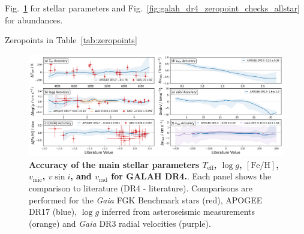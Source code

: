 \documentclass[
  journal=pasa,
  manuscript=research-paper, %
  year=2024,
  volume=37
]{cup-journal}
\newcommand{\SB}[1]{{\textcolor{purple}{#1}}}
\newcommand{\Teff}{$T_\mathrm{eff}$\xspace}
\newcommand{\logg}{$\log g$\xspace}
\newcommand{\feh}{$\mathrm{[Fe/H]}$\xspace}
\newcommand{\vmic}{$v_\mathrm{mic}$\xspace}
\newcommand{\vsini}{$v \sin i$\xspace}
\newcommand{\vrad}{$v_\mathrm{rad}$\xspace}
\newcommand{\Gaia}{\textit{Gaia}\xspace}
\begin{document}

Fig.~\ref{fig:galah_dr4_validation_parameter_accuracy_allstar} for stellar parameters and Fig.~\ref{fig:galah_dr4_zeropoint_checks_allstar} for abundances.

Zeropoints in Table~\ref{tab:zeropoints}



\begin{figure}[ht]
 \centering
 \includegraphics[width=\textwidth]{figures/galah_dr4_validation_parameter_accuracy_allstar.png}
 \caption{\textbf{Accuracy of the main stellar parameters \Teff, \logg, \feh, \vmic, \vsini, and \vrad for GALAH DR4.}. Each panel shows the comparison to literature (DR4 - literature). Comparisons are performed for the \Gaia FGK Benchmark stars (red), APOGEE DR17 (blue), \logg inferred from asteroseismic measurements (orange) and \Gaia DR3 radial velocities (purple).}
 \label{fig:galah_dr4_validation_parameter_accuracy_allstar}
\end{figure}
\end{document}
